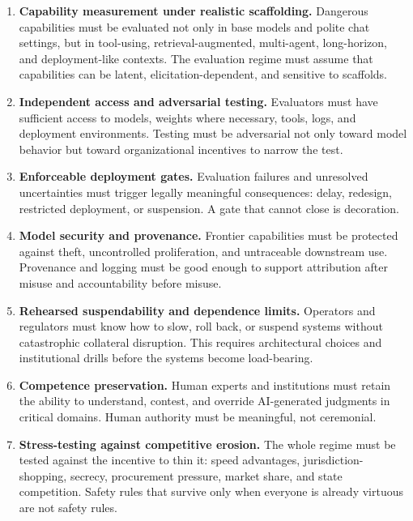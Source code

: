 \documentclass[11pt]{article}
\begin{document}
\begin{enumerate}
\item \textbf{Capability measurement under realistic scaffolding.} Dangerous capabilities must be evaluated not only in base models and polite chat settings, but in tool-using, retrieval-augmented, multi-agent, long-horizon, and deployment-like contexts. The evaluation regime must assume that capabilities can be latent, elicitation-dependent, and sensitive to scaffolds.

\item \textbf{Independent access and adversarial testing.} Evaluators must have sufficient access to models, weights where necessary, tools, logs, and deployment environments. Testing must be adversarial not only toward model behavior but toward organizational incentives to narrow the test.

\item \textbf{Enforceable deployment gates.} Evaluation failures and unresolved uncertainties must trigger legally meaningful consequences: delay, redesign, restricted deployment, or suspension. A gate that cannot close is decoration.

\item \textbf{Model security and provenance.} Frontier capabilities must be protected against theft, uncontrolled proliferation, and untraceable downstream use. Provenance and logging must be good enough to support attribution after misuse and accountability before misuse.

\item \textbf{Rehearsed suspendability and dependence limits.} Operators and regulators must know how to slow, roll back, or suspend systems without catastrophic collateral disruption. This requires architectural choices and institutional drills before the systems become load-bearing.

\item \textbf{Competence preservation.} Human experts and institutions must retain the ability to understand, contest, and override AI-generated judgments in critical domains. Human authority must be meaningful, not ceremonial.

\item \textbf{Stress-testing against competitive erosion.} The whole regime must be tested against the incentive to thin it: speed advantages, jurisdiction-shopping, secrecy, procurement pressure, market share, and state competition. Safety rules that survive only when everyone is already virtuous are not safety rules.
\end{enumerate}
\end{document}
